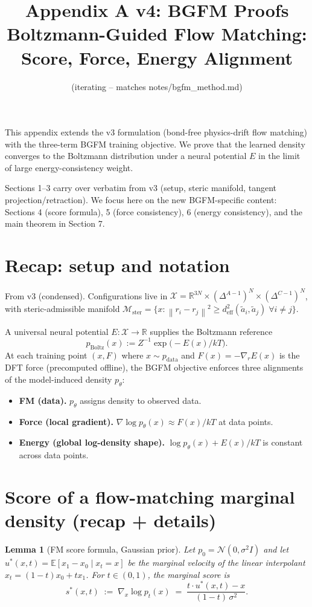 \documentclass[11pt]{article}
\title{Appendix A v4: BGFM Proofs \\ \large Boltzmann-Guided Flow Matching: Score, Force, Energy Alignment}
\author{(iterating -- matches notes/bgfm_method.md)}
\date{}
\newtheorem{lemma}[theorem]{Lemma}
\theoremstyle{remark}
\theoremstyle{plain}
\newcommand{\M}{\mathcal{M}}
\newcommand{\X}{\mathcal{X}}
\newcommand{\R}{\mathbb{R}}
\newcommand{\E}{\mathbb{E}}
\newcommand{\ster}{\mathrm{ster}}
\newcommand{\norm}[1]{\left\|#1\right\|}
\begin{document}
\maketitle

This appendix extends the v3 formulation (bond-free physics-drift flow
matching) with the three-term BGFM training objective. We prove that the
learned density converges to the Boltzmann distribution under a neural
potential $E$ in the limit of large energy-consistency weight.

Sections 1--3 carry over verbatim from v3 (setup, steric manifold,
tangent projection/retraction). We focus here on the new BGFM-specific
content: Sections 4 (score formula), 5 (force consistency), 6 (energy
consistency), and the main theorem in Section 7.

\section{Recap: setup and notation}

From v3 (condensed). Configurations live in
$\X = \R^{3N} \times (\Delta^{A-1})^N \times (\Delta^{C-1})^N$, with
steric-admissible manifold $\M_\ster = \{x : \norm{r_i - r_j}^2 \ge
d_\mathrm{eff}^2(\tilde a_i, \tilde a_j) \; \forall i \ne j\}$.

A universal neural potential $E : \X \to \R$ supplies the Boltzmann
reference
\[
p_\mathrm{Boltz}(x) := Z^{-1} \exp\!\big(-E(x)/kT\big).
\]
At each training point $(x, F)$ where $x \sim p_\text{data}$ and $F(x)
= -\nabla_r E(x)$ is the DFT force (precomputed offline), the BGFM
objective enforces three alignments of the model-induced density
$p_\theta$:

\begin{itemize}
\item \textbf{FM (data).} $p_\theta$ assigns density to observed data.
\item \textbf{Force (local gradient).} $\nabla \log p_\theta(x)
      \approx F(x)/kT$ at data points.
\item \textbf{Energy (global log-density shape).} $\log p_\theta(x) +
      E(x)/kT$ is constant across data points.
\end{itemize}

\section{Score of a flow-matching marginal density (recap + details)}

\begin{lemma}[FM score formula, Gaussian prior]\label{lem:score}
Let $p_0 = \mathcal{N}(0, \sigma^2 I)$ and let $u^*(x, t) = \E[x_1 - x_0
\mid x_t = x]$ be the marginal velocity of the linear interpolant
$x_t = (1 - t) x_0 + t x_1$. For $t \in (0, 1)$, the marginal score is
\begin{equation}\label{eq:score}
s^*(x, t) \;:=\; \nabla_x \log p_t(x) \;=\; \frac{t \cdot u^*(x, t) - x}{(1 - t)\, \sigma^2}.
\end{equation}
\end{lemma}
\end{document}
